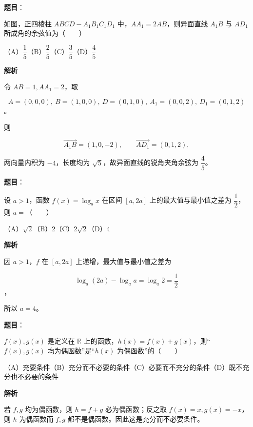 \begin{answer}

\textbf{题目}：

如图，正四棱柱 $ABCD-A_1B_1C_1D_1$ 中，$AA_1=2AB$，则异面直线 $A_1B$ 与 $AD_1$ 所成角的余弦值为\mbox{（　　）}
\nopagebreak[4]
\begin{center}\end{center}
\nopagebreak[4]
（A）$\dfrac15$\quad（B）$\dfrac25$\quad（C）$\dfrac35$\quad（D）$\dfrac45$

\textbf{解析}

令 $AB=1,AA_1=2$，取

\nopagebreak[4]
\[
A=(0,0,0),\ B=(1,0,0),\ D=(0,1,0),\ A_1=(0,0,2),\ D_1=(0,1,2)
\]
。

则

\nopagebreak[4]
\[
\overrightarrow{A_1B}=(1,0,-2),\qquad
\overrightarrow{AD_1}=(0,1,2),
\]

两向量内积为 $-4$，长度均为 $\sqrt5$，故异面直线的锐角夹角余弦为 $\dfrac45$。


\end{answer}
\begin{answer}

\textbf{题目}：

设 $a>1$，函数 $f(x)=\log_a x$ 在区间 $[a,2a]$ 上的最大值与最小值之差为 $\dfrac12$，则 $a=$\mbox{（　　）}

（A）$\sqrt2$\quad（B）$2$\quad（C）$2\sqrt2$\quad（D）$4$

\textbf{解析}

因 $a>1$，$f$ 在 $[a,2a]$ 上递增，最大值与最小值之差为

\nopagebreak[4]
\[
\log_a(2a)-\log_a a=\log_a2=\frac12
\]
，

所以 $a=4$。


\end{answer}
\begin{answer}

\textbf{题目}：

$f(x),g(x)$ 是定义在 $\mathbb R$ 上的函数，$h(x)=f(x)+g(x)$，则“$f(x),g(x)$ 均为偶函数”是“$h(x)$ 为偶函数”的\mbox{（　　）}

（A）充要条件\quad（B）充分而不必要的条件\quad（C）必要而不充分的条件\quad（D）既不充分也不必要的条件

\textbf{解析}

若 $f,g$ 均为偶函数，则 $h=f+g$ 必为偶函数；反之取 $f(x)=x,g(x)=-x$，则 $h$ 为偶函数而 $f,g$ 都不是偶函数。因此这是充分而不必要条件。


\end{answer}
